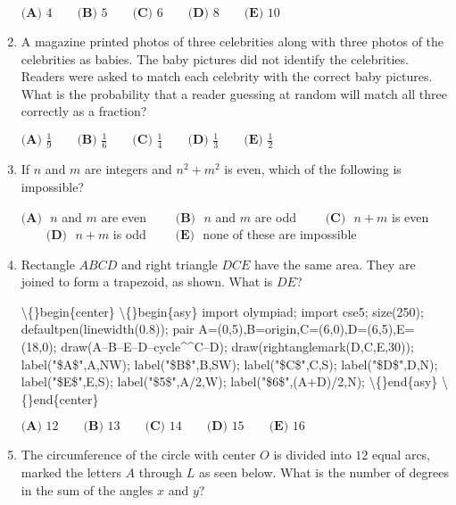 \documentclass{article}
\begin{document}
\begin{enumerate}[label=\arabic*., itemsep=0.5em]
\( \textbf{(A) }4\qquad\textbf{(B) }5\qquad\textbf{(C) }6\qquad\textbf{(D) }8\qquad\textbf{(E) }10 \)\par \vspace{0.5em}\item A magazine printed photos of three celebrities along with three photos of the celebrities as babies. The baby pictures did not identify the celebrities. Readers were asked to match each celebrity with the correct baby pictures. What is the probability that a reader guessing at random will match all three correctly as a fraction?

\( \textbf{(A) }\frac{1}{9}\qquad\textbf{(B) }\frac{1}{6}\qquad\textbf{(C) }\frac{1}{4}\qquad\textbf{(D) }\frac{1}{3}\qquad\textbf{(E) }\frac{1}{2} \)\par \vspace{0.5em}\item If \(n\) and \(m\) are integers and \(n^2+m^2\) is even, which of the following is impossible?

\(\textbf{(A) }\) \(n\) and \(m\) are even \(\qquad\textbf{(B) }\) \(n\) and \(m\) are odd \(\qquad\textbf{(C) }\) \(n+m\) is even \(\qquad\textbf{(D) }\) \(n+m\) is odd \(\qquad \textbf{(E) }\) none of these are impossible\par \vspace{0.5em}\item Rectangle \(ABCD\) and right triangle \(DCE\) have the same area. They are joined to form a trapezoid, as shown. What is \(DE\)?


\textbackslash\{\}begin\{center\}
\textbackslash\{\}begin\{asy\}
import olympiad;
import cse5;
size(250);
defaultpen(linewidth(0.8));
pair A=(0,5),B=origin,C=(6,0),D=(6,5),E=(18,0);
draw(A--B--E--D--cycle\^{}\^{}C--D);
draw(rightanglemark(D,C,E,30));
label("\$A\$",A,NW);
label("\$B\$",B,SW);
label("\$C\$",C,S);
label("\$D\$",D,N);
label("\$E\$",E,S);
label("\$5\$",A/2,W);
label("\$6\$",(A+D)/2,N);
\textbackslash\{\}end\{asy\}
\textbackslash\{\}end\{center\}


\( \textbf{(A) }12\qquad\textbf{(B) }13\qquad\textbf{(C) }14\qquad\textbf{(D) }15\qquad\textbf{(E) }16 \)\par \vspace{0.5em}\item The circumference of the circle with center \(O\) is divided into \(12\) equal arcs, marked the letters \(A\) through \(L\) as seen below. What is the number of degrees in the sum of the angles \(x\) and \(y\)?



\end{enumerate}
\end{document}
